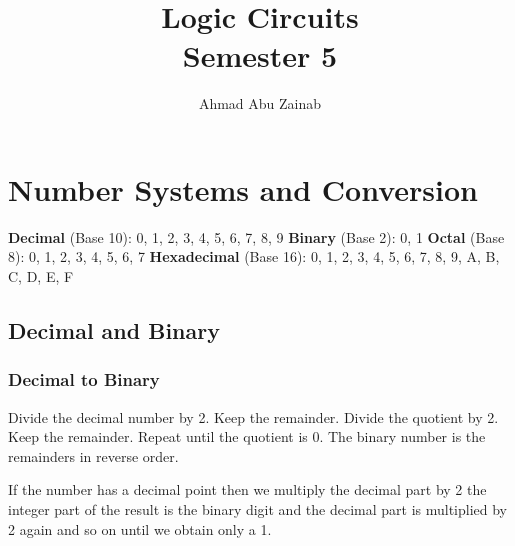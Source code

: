 \documentclass{report}
\title{\Huge{Logic Circuits}\\Semester 5}
\author{\huge{Ahmad Abu Zainab}}
\date{}
\begin{document}
\maketitle
\newpage%
\tableofcontents
\pagebreak

\chapter{Number Systems and Conversion}

\begin{itemize}
	\ii \textbf{Decimal} (Base 10): 0, 1, 2, 3, 4, 5, 6, 7, 8, 9
	\ii \textbf{Binary} (Base 2): 0, 1
	\ii \textbf{Octal} (Base 8): 0, 1, 2, 3, 4, 5, 6, 7
	\ii \textbf{Hexadecimal} (Base 16): 0, 1, 2, 3, 4, 5, 6, 7, 8, 9, A, B, C, D, E, F
\end{itemize}

\section{Decimal and Binary}

\subsection{Decimal to Binary}

\begin{enumerate}
	\ii Divide the decimal number by 2.
	\ii Keep the remainder.
	\ii Divide the quotient by 2.
	\ii Keep the remainder.
	\ii Repeat until the quotient is 0.
	\ii The binary number is the remainders in reverse order.
\end{enumerate}

If the number has a decimal point then we multiply the decimal part by 2 the integer part of the result is the binary digit and the decimal part is multiplied by 2 again and so on until we obtain only a 1.

\end{document}
